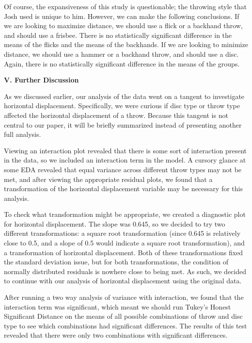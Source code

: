 \documentclass[letter,12pt]{article}
\begin{document}
  Of course, the expansiveness of this study is questionable; the throwing style that Josh used is unique to him. However, we can make the following conclusions. If we are looking to maximize distance, we should use a flick or a backhand throw, and should use a frisbee. There is no statistically significant difference in the means of the flicks and the means of the backhands. If we are looking to minimize distance, we should use a hammer or a backhand throw, and should use a disc. Again, there is no statistically significant difference in the means of the groups.\par
	
	\begin{center}
		\textbf{V. Further Discussion}
	\end{center}
	\justify
	As we discussed earlier, our analysis of the data went on a tangent to investigate horizontal displacement. Specifically, we were curious if disc type or throw type affected the horizontal displacement of a throw. Because this tangent is not central to our paper, it will be briefly summarized instead of presenting another full analysis.\par
	Viewing an interaction plot revealed that there is some sort of interaction present in the data, so we included an interaction term in the model. A cursory glance at some EDA revealed that equal variance across different throw types may not be met, and after viewing the appropriate residual plots, we found that a transformation of the horizontal displacement variable may be necessary for this analysis.\par
	To check what transformation might be appropriate, we created a diagnostic plot for horizontal displacement. The slope was 0.645, so we decided to try two different transformations: a square root transformation (since 0.645 is relatively close to 0.5, and a slope of 0.5 would indicate a square root transformation), and a transformation of horizontal displacement. Both of these transformations fixed the standard deviation issue, but for both transformations, the condition of normally distributed residuals is nowhere close to being met. As such, we decided to continue with our analysis of horizontal displacement using the original data. \par
	After running a two way analysis of variance with interaction, we found that the interaction term was significant, which meant we should run Tukey’s Honest Significant Distance on the means of all possible combinations of throw and disc type to see which combinations had significant differences. The results of this test revealed that there were only two combinations with significant differences.\par
\end{document}
